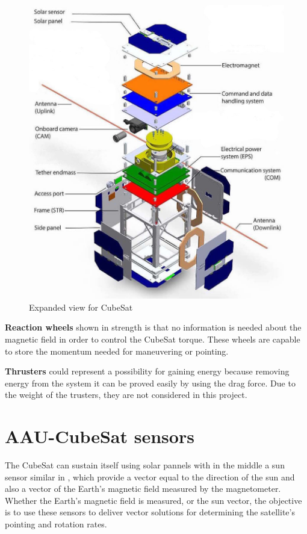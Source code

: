 \begin{table}[H]
\begin{minipage}[b]{0.49\linewidth}
\begin{figure}[H]
			\includegraphics[width=1\linewidth]{figures/cubsat1}
			\caption{Expanded view for CubeSat \cite{view}}
			\label{fig:csat}
		\end{figure}
	\end{minipage}
\end{table}
%
\textbf{Reaction wheels} shown in  strength is that no information is needed about the magnetic field in order to control the CubeSat torque. These wheels are capable to store the momentum needed for maneuvering or pointing.

\textbf{Thrusters} could represent a possibility for gaining energy because removing energy from the system it can be proved easily by using the drag force. Due to the weight of the trusters, they are not considered in this project.
\section{AAU-CubeSat sensors}
The CubeSat can sustain itself using solar pannels with in the middle a sun sensor similar in  , which provide a vector equal to the direction of the sun and also a vector of the Earth's magnetic field measured by the magnetometer. Whether the Earth’s magnetic field is measured, or the sun vector, the objective is to use these sensors to deliver vector solutions for determining the satellite’s pointing and rotation rates.

